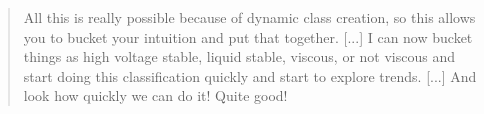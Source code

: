 \begin{quote}
All this is really possible because of dynamic class creation, so this allows you to bucket your intuition and put that together. [...] I can now bucket things as high voltage stable, liquid stable, viscous, or not viscous and start doing this classification quickly and start to explore trends. [...] And look how quickly we can do it! Quite good!
\end{quote}
